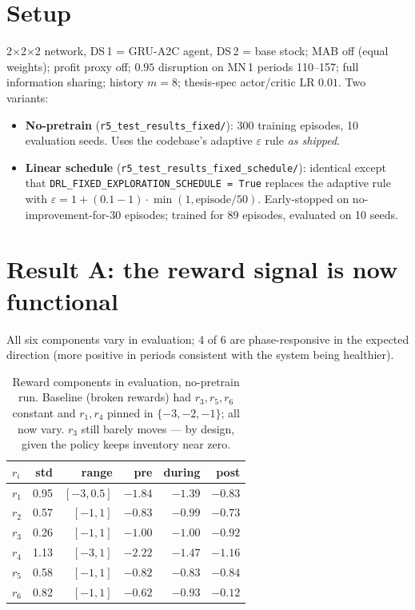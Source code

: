 \documentclass[11pt,letterpaper]{article}
\newcommand{\code}[1]{\texttt{\small #1}}
\begin{document}
\section{Setup}

2$\times$2$\times$2 network, DS\,1 = GRU-A2C agent, DS\,2 = base stock; MAB off
(equal weights); profit proxy off; $0.95$ disruption on MN\,1 periods 110--157;
full information sharing; history $m=8$; thesis-spec actor/critic LR $0.01$.
Two variants:
\begin{itemize}
  \item \textbf{No-pretrain} (\code{r5\_test\_results\_fixed/}): 300 training
  episodes, 10 evaluation seeds. Uses the codebase's adaptive
  $\varepsilon$ rule \emph{as shipped}.
  \item \textbf{Linear schedule} (\code{r5\_test\_results\_fixed\_schedule/}):
  identical except that \code{DRL\_FIXED\_EXPLORATION\_SCHEDULE = True}
  replaces the adaptive rule with $\varepsilon = 1 + (0.1 - 1)\cdot
  \min(1, \text{episode}/50)$. Early-stopped on no-improvement-for-30
  episodes; trained for 89 episodes, evaluated on 10 seeds.
\end{itemize}

\section{Result A: the reward signal is now functional}

All six components vary in evaluation; 4 of 6 are phase-responsive in the
expected direction (more positive in periods consistent with the system being
healthier).

\begin{table}[h!]\centering\small
\begin{tabular}{lrrrrr}
\toprule
$r_i$ & std & range & pre & during & post \\
\midrule
$r_1$ & 0.95 & $[-3, 0.5]$ & $-1.84$ & $-1.39$ & $-0.83$ \\
$r_2$ & 0.57 & $[-1, 1]$ & $-0.83$ & $-0.99$ & $-0.73$ \\
$r_3$ & 0.26 & $[-1, 1]$ & $-1.00$ & $-1.00$ & $-0.92$ \\
$r_4$ & 1.13 & $[-3, 1]$ & $-2.22$ & $-1.47$ & $-1.16$ \\
$r_5$ & 0.58 & $[-1, 1]$ & $-0.82$ & $-0.83$ & $-0.84$ \\
$r_6$ & 0.82 & $[-1, 1]$ & $-0.62$ & $-0.93$ & $-0.12$ \\
\bottomrule
\end{tabular}
\caption{Reward components in evaluation, no-pretrain run.  Baseline (broken
rewards) had $r_3,r_5,r_6$ constant and $r_1,r_4$ pinned in $\{-3,-2,-1\}$;
all now vary.  $r_3$ still barely moves --- by design, given the policy keeps
inventory near zero.}
\end{table}
\end{document}
